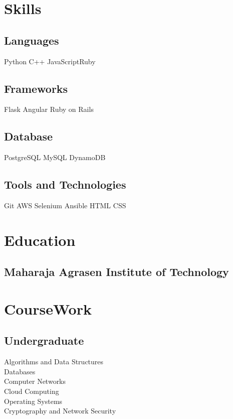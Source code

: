 \documentclass[letterpaper]{deedy-resume}
\begin{document}
\begin{minipage}[t]{0.29\textwidth}

\section{Skills}
\subsection{Languages}
Python \textbullet{}C++ \textbullet{} JavaScript\textbullet{}Ruby
\sectionspace
\subsection{Frameworks}
 Flask \textbullet{} Angular\textbullet{} Ruby on Rails
\sectionspace
\subsection{Database}
 PostgreSQL \textbullet{} MySQL\textbullet{} DynamoDB
\sectionspace
\subsection{Tools and Technologies}
 Git \textbullet{} AWS\textbullet{} Selenium\textbullet{} Ansible\textbullet{} HTML\textbullet{} CSS
\sectionspace


\section{Education} 
\subsection{Maharaja Agrasen Institute of Technology}


\section{CourseWork}
\sectionspace
\subsection{Undergraduate}
\sectionspace
Algorithms and Data Structures \\
Databases\\
Computer Networks \\
Cloud Computing \\
Operating Systems \\
Cryptography and Network Security \\
\sectionspace

\end{minipage}
\end{document}
